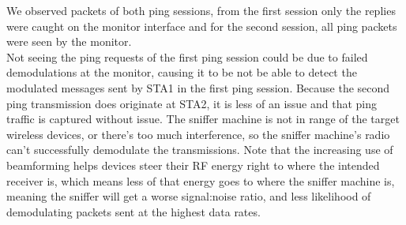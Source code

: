 We observed packets of both ping sessions, from the first session only the replies were caught on the monitor interface and for the second session, all ping packets were seen by the monitor.\\
%
Not seeing the ping requests of the first ping session could be due to failed demodulations at the monitor, causing it to be not be able to detect the modulated
messages sent by STA1 in the first ping session. Because the second ping transmission does originate at STA2, it is less of an issue and that ping traffic is captured without issue.
%
The sniffer machine is not in range of the target wireless devices, or there's too much interference, so the sniffer machine's radio
can't successfully demodulate the transmissions. Note that the increasing use of beamforming helps devices steer their RF energy right
to where the intended receiver is, which means less of that energy goes to where the sniffer machine is, meaning the sniffer will
get a worse signal:noise ratio, and less likelihood of demodulating packets sent at the highest data rates.
